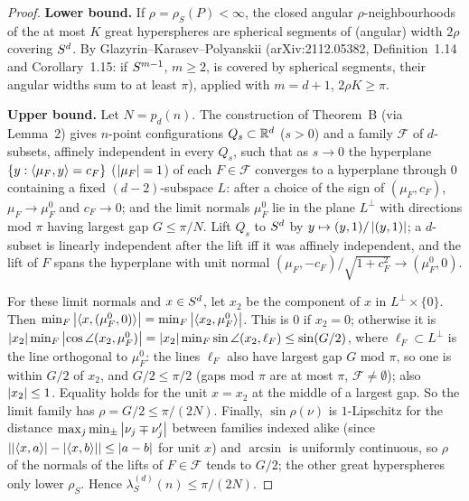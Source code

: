 \begin{proof}
\textbf{Lower bound.} If $\rho=\rho_S(P)<\infty$, the closed angular $\rho$-neighbourhoods of the at most $K$
great hyperspheres are spherical segments of (angular) width $2\rho$ covering $S^d$. By Glazyrin--Karasev--Polyanskii
(arXiv:2112.05382, Definition~1.14 and Corollary~1.15: if $S^{m-1}$, $m\ge2$, is covered by spherical
segments, their angular widths sum to at least $\pi$), applied with $m=d+1$, $2\rho K\ge\pi$.

\textbf{Upper bound.} Let $N=p_d(n)$. The construction of Theorem~B (via Lemma~2) gives $n$-point
configurations $Q_s\subset\mathbb{R}^d$ ($s>0$) and a family $\mathcal F$ of $d$-subsets, affinely independent in
every $Q_s$, such that as $s\to0$ the hyperplane $\{y:\langle \mu_F,y\rangle=c_F\}$ ($\left|\mu_F\right|=1$) of each
$F\in\mathcal F$ converges to a hyperplane through $0$ containing a fixed $(d-2)$-subspace $L$: after a choice of
the sign of $(\mu_F,c_F)$, $\mu_F\to\mu_F^0$ and $c_F\to0$; and the limit normals $\mu_F^0$ lie in the plane $L^\perp$ with directions mod $\pi$
having largest gap $G\le\pi/N$. Lift $Q_s$ to $S^d$ by $y\mapsto(y,1)/\left|(y,1)\right|$; a $d$-subset is linearly
independent after the lift iff it was affinely independent, and the lift of $F$ spans the hyperplane with
unit normal $(\mu_F,-c_F)/\sqrt{1+c_F^2}\to(\mu_F^0,0)$.

For these limit normals and $x\in S^d$, let $x_2$ be the component of $x$ in $L^\perp\times\{0\}$. Then
$\min_F\left|\langle x,(\mu_F^0,0)\rangle\right|=\min_F\left|\langle x_2,\mu_F^0\rangle\right|$. This is $0$ if $x_2=0$; otherwise it is
$\left|x_2\right|\min_F\left|\cos\angle(x_2,\mu_F^0)\right|=\left|x_2\right|\min_F\sin\angle(x_2,\ell_F)\le\sin(G/2)$, where $\ell_F\subset L^\perp$ is
the line orthogonal to $\mu_F^0$: the lines $\ell_F$ also have largest gap $G$ mod $\pi$, so one is within $G/2$
of $x_2$, and $G/2\le\pi/2$ (gaps mod $\pi$ are at most $\pi$, $\mathcal F\ne\emptyset$); also $\left|x_2\right|\le1$. Equality holds
for the unit $x=x_2$ at the middle of a largest gap. So the limit family has $\rho=G/2\le\pi/(2N)$. Finally,
$\sin\rho(\nu)$ is $1$-Lipschitz for the distance $\max_j\min_\pm\left|\nu_j\mp\nu'_j\right|$ between families indexed alike
(since $\left|\left|\langle x,a\rangle\right|-\left|\langle x,b\rangle\right|\right|\le\left|a-b\right|$ for unit $x$) and $\arcsin$ is uniformly continuous,
so $\rho$ of the normals of the lifts of $F\in\mathcal F$ tends to $G/2$; the other great hyperspheres only
lower $\rho_S$. Hence $\lambda_S^{(d)}(n)\le\pi/(2N)$.
\end{proof}

